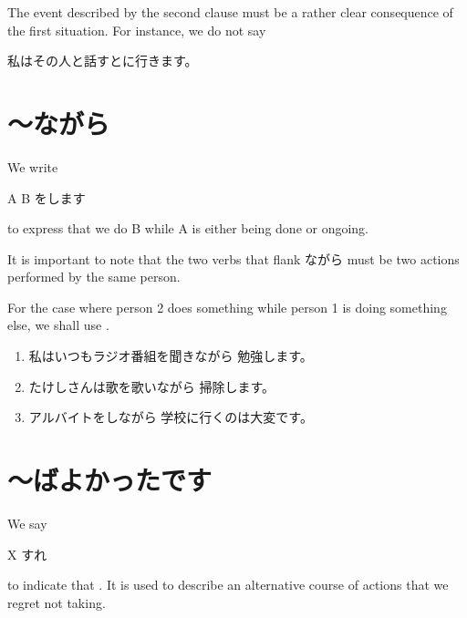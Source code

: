 \documentclass[notoc,notitlepage]{tufte-book}
\begin{document}
\begin{warning}
  The event described by the second clause must be a rather clear consequence
  of the first situation.
  For instance, we do not say
  \begin{center}
    私はその人と話すとに行きます。
  \end{center}
\end{warning}


\section{〜ながら}%
\label{sec:_nagara}

\begin{defn}[〜ながら]\label{defn:nagara}
  We write
  \begin{center}
    A  B をします
  \end{center}
  to express that we do B while A is either being done or ongoing.
\end{defn}

\begin{note}
  It is important to note that the two verbs that flank ながら
  must be two actions performed by the same person.

  For the case where person 2 does something
  while person 1 is doing something else, we shall use
  .
\end{note}

\begin{eg}
  \begin{enumerate}
    \item 私はいつもラジオ番組を聞きながら
      勉強します。
    \item たけしさんは歌を歌いながら
      掃除します。
    \item アルバイトをしながら
      学校に行くのは大変です。
  \end{enumerate}
\end{eg}


\section{〜ばよかったです}%
\label{sec:_bayokatsutadesu}

\begin{defn}[〜ばよかったです]\label{defn:_bayokatsutadesu}
  We say
  \begin{center}
    X すれ
  \end{center}
  to indicate that .
  It is used to describe an alternative course of actions that we
  regret not taking.
\end{defn}
\end{document}
